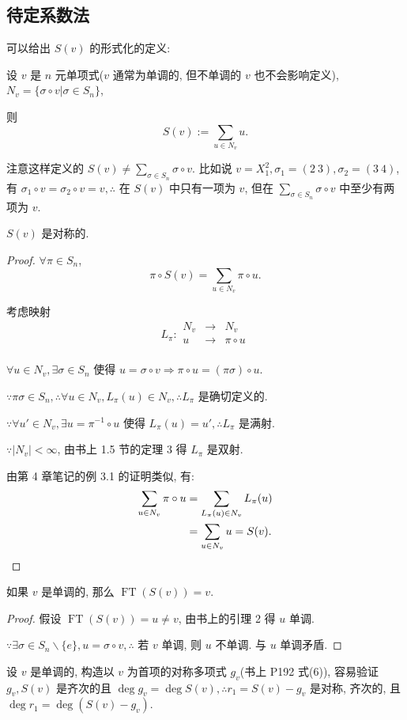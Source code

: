 \documentclass[UTF8]{ctexart}
\begin{document}
\subsection{待定系数法}
可以给出 $S(v)$ 的形式化的定义:
\begin{definition}
    设 $v$ 是 $n$ 元单项式($v$ 通常为单调的, 但不单调的 $v$ 也不会影响定义), $N_v=\{\sigma\circ v|\sigma\in S_n\}$,
    
    则
    \[S(v):=\sum_{u\in N_v}u.\]
\end{definition}
注意这样定义的 $S(v)\neq\sum\limits_{\sigma\in S_n}\sigma\circ v$. 比如说 $v=X_1^2,\sigma_1=(2\ 3),\sigma_2=(3\ 4)$, 有 $\sigma_1\circ v=\sigma_2\circ v=v,\therefore$ 在 $S(v)$ 中只有一项为 $v$, 但在 $\sum\limits_{\sigma\in S_n}\sigma\circ v$ 中至少有两项为 $v$.
\begin{theorem}
    $S(v)$ 是对称的.
\end{theorem}
\begin{proof}
    $\forall\pi\in S_n$,
    \[\pi\circ S(v)=\sum_{u\in N_v}\pi\circ u.\]

    考虑映射
    \[L_\pi:\begin{array}{rcl}
        N_v & \to & N_v \\
        u & \to & \pi\circ u \\
    \end{array}\]

    $\forall u\in N_v,\exists\sigma\in S_n$ 使得 $u=\sigma\circ v\Rightarrow\pi\circ u=(\pi\sigma)\circ u$.

    $\because\pi\sigma\in S_n,\therefore\forall u\in N_v,L_\pi(u)\in N_v,\therefore L_\pi$ 是确切定义的.

    $\because\forall u'\in N_v,\exists u=\pi^{-1}\circ u$ 使得 $L_\pi(u)=u',\therefore L_\pi$ 是满射.

    $\because|N_v|<\infty$, 由书上 1.5 节的定理 3 得 $L_\pi$ 是双射.
    
    由第 4 章笔记的例 3.1 的证明类似, 有:
    \begin{align*}
        \sum_{u\in N_v}\pi\circ u & =\sum_{L_\pi(u)\in N_v}L_\pi(u) \\
        & =\sum_{u\in N_v}u=S(v).\qedhere
    \end{align*}
\end{proof}
\begin{theorem}
    如果 $v$ 是单调的, 那么 $\operatorname{FT}(S(v))=v$.
\end{theorem}
\begin{proof}
    假设 $\operatorname{FT}(S(v))=u\neq v$, 由书上的引理 2 得 $u$ 单调.

    $\because\exists\sigma\in S_n\backslash\{e\},u=\sigma\circ v,\therefore$ 若 $v$ 单调, 则 $u$ 不单调. 与 $u$ 单调矛盾.
\end{proof}
设 $v$ 是单调的, 构造以 $v$ 为首项的对称多项式 $g_v$(书上 P192 式(6)), 容易验证 $g_v,S(v)$ 是齐次的且 $\deg g_v=\deg S(v),\therefore r_1=S(v)-g_v$ 是对称, 齐次的, 且 $\deg r_1=\deg(S(v)-g_v)$.
\end{document}
